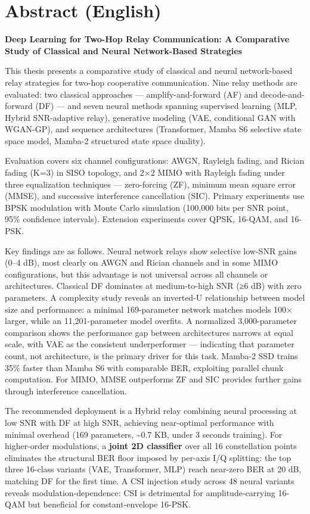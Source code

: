 \documentclass[
  english,
  12pt,
  12pt,
  a4paper,
  oneside]{report}
\begin{document}
\chapter*{Abstract (English)}\label{sec:abstract-english}

\textbf{Deep Learning for Two-Hop Relay Communication: A Comparative Study of Classical and Neural Network-Based Strategies}

This thesis presents a comparative study of classical and neural network-based relay strategies for two-hop cooperative communication. Nine relay methods are evaluated: two classical approaches --- amplify-and-forward (AF) and decode-and-forward (DF) --- and seven neural methods spanning supervised learning (MLP, Hybrid SNR-adaptive relay), generative modeling (VAE, conditional GAN with WGAN-GP), and sequence architectures (Transformer, Mamba S6 selective state space model, Mamba-2 structured state space duality).

Evaluation covers six channel configurations: AWGN, Rayleigh fading, and Rician fading (K=3) in SISO topology, and 2×2 MIMO with Rayleigh fading under three equalization techniques --- zero-forcing (ZF), minimum mean square error (MMSE), and successive interference cancellation (SIC). Primary experiments use BPSK modulation with Monte Carlo simulation (100,000 bits per SNR point, 95\% confidence intervals). Extension experiments cover QPSK, 16-QAM, and 16-PSK.

Key findings are as follows. Neural network relays show selective low-SNR gains (0--4 dB), most clearly on AWGN and Rician channels and in some MIMO configurations, but this advantage is not universal across all channels or architectures. Classical DF dominates at medium-to-high SNR (≥6 dB) with zero parameters. A complexity study reveals an inverted-U relationship between model size and performance: a minimal 169-parameter network matches models 100× larger, while an 11,201-parameter model overfits. A normalized 3,000-parameter comparison shows the performance gap between architectures narrows at equal scale, with VAE as the consistent underperformer --- indicating that parameter count, not architecture, is the primary driver for this task. Mamba-2 SSD trains 35\% faster than Mamba S6 with comparable BER, exploiting parallel chunk computation. For MIMO, MMSE outperforms ZF and SIC provides further gains through interference cancellation.

The recommended deployment is a Hybrid relay combining neural processing at low SNR with DF at high SNR, achieving near-optimal performance with minimal overhead (169 parameters, \textasciitilde0.7 KB, under 3 seconds training). For higher-order modulations, a \textbf{joint 2D classifier} over all 16 constellation points eliminates the structural BER floor imposed by per-axis I/Q splitting: the top three 16-class variants (VAE, Transformer, MLP) reach near-zero BER at 20 dB, matching DF for the first time. A CSI injection study across 48 neural variants reveals modulation-dependence: CSI is detrimental for amplitude-carrying 16-QAM but beneficial for constant-envelope 16-PSK.
\end{document}
